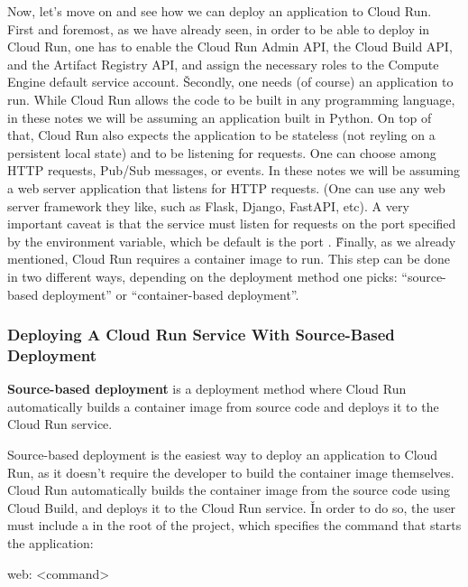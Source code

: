 Now, let's move on and see how we can deploy an application to Cloud Run. First and foremost, as we have already
seen, in order to be able to deploy in Cloud Run, one has to enable the Cloud Run Admin API, the Cloud Build API,
and the Artifact Registry API, and assign the necessary roles to the Compute Engine default service account. \v

Secondly, one needs (of course) an application to run. While Cloud Run allows the code to be built in any
programming language, in these notes we will be assuming an application built in Python. On top of that, Cloud Run
also expects the application to be stateless (not reyling on a persistent local state) and to be listening for
requests. One can choose among HTTP requests, Pub/Sub messages, or events. In these notes we will be assuming a web
server application that listens for HTTP requests. (One can use any web server framework they like, such as Flask,
Django, FastAPI, etc). A very important caveat is that the service must listen for requests on the port specified by
the  environment variable, which be default is the port . \v

Finally, as we already mentioned, Cloud Run requires a container image to run. This step can be done in two different
ways, depending on the deployment method one picks: ``source-based deployment'' or ``container-based deployment''.

\subsubsection{Deploying A Cloud Run Service With Source-Based Deployment}

\textbf{Source-based deployment} is a deployment method where Cloud Run automatically builds a container image from
source code and deploys it to the Cloud Run service.
\ed

Source-based deployment is the easiest way to deploy an application to Cloud Run, as it doesn't require the developer
to build the container image themselves. Cloud Run automatically builds the container image from the source code
using Cloud Build, and deploys it to the Cloud Run service. \v

In order to do so, the user must include a  in the root of the project, which specifies the command that
starts the application:
\begin{block}
web: <command>
\end{block}

